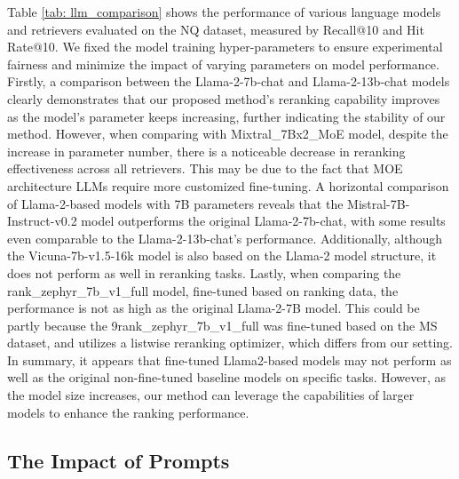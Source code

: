 \documentclass[sigconf,natbib=true,anonymous=false]{acmart}
\begin{document}
Table \ref{tab: llm_comparison} shows the performance of various language models and retrievers evaluated on the NQ dataset, measured by Recall@10 and Hit Rate@10. We fixed the model training hyper-parameters to ensure experimental fairness and minimize the impact of varying parameters on model performance. Firstly, a comparison between the Llama-2-7b-chat and Llama-2-13b-chat models clearly demonstrates that our proposed method's reranking capability improves as the model's parameter keeps increasing, further indicating the stability of our method. However, when comparing with Mixtral\_7Bx2\_MoE model, despite the increase in parameter number, there is a noticeable decrease in reranking effectiveness across all retrievers. This may be due to the fact that MOE architecture LLMs require more customized fine-tuning. A horizontal comparison of Llama-2-based models with 7B parameters reveals that the Mistral-7B-Instruct-v0.2 model outperforms the original Llama-2-7b-chat, with some results even comparable to the Llama-2-13b-chat's performance. Additionally, although the Vicuna-7b-v1.5-16k model is also based on the Llama-2 model structure, it does not perform as well in reranking tasks. Lastly, when comparing the rank\_zephyr\_7b\_v1\_full model, fine-tuned based on ranking data, the performance is not as high as the original Llama-2-7B model. This could be partly because the 9rank\_zephyr\_7b\_v1\_full was fine-tuned based on the MS dataset, and utilizes a listwise reranking optimizer, which differs from our setting. In summary, it appears that fine-tuned Llama2-based models may not perform as well as the original non-fine-tuned baseline models on specific tasks. However, as the model size increases, our method can leverage the capabilities of larger models to enhance the ranking performance.


\subsection{The Impact of Prompts}
\label{sec: prompt}

\begin{table}[t]
\centering
{}
\caption{Different hard prompts utilized in UPR and Q-PEFT-based models.}
\label{tab: hard_prompt}
\end{table}
\end{document}

